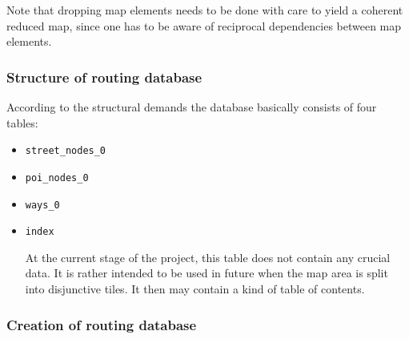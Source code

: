 Note that dropping map elements needs to be done with care to yield a coherent reduced map, since one has to be aware of reciprocal   dependencies between map elements.\newline

\subsubsection{Structure of routing database}

According to the structural demands the database basically consists of four tables:

\begin{itemize}
		
	\item \texttt{street\_nodes\_0}
	\item \texttt{poi\_nodes\_0}
	\item \texttt{ways\_0}
	
	\item \texttt{index}
	
		At the current stage of the project, this table does not contain any crucial data. It is rather intended to be used in future when the map area is split into disjunctive tiles. It then may contain a kind of table of contents.
		
\end{itemize}


\subsubsection{Creation of routing database}